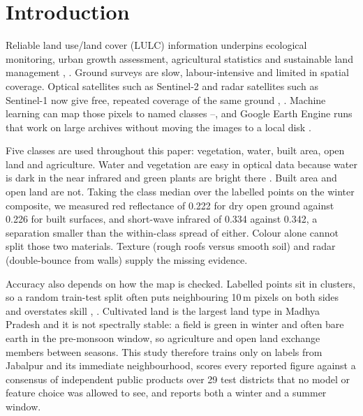 \documentclass[conference]{IEEEtran}
\begin{document}
\section{Introduction}
Reliable land use/land cover (LULC) information underpins ecological monitoring, urban growth assessment, agricultural statistics and sustainable land management \cite{r1}, \cite{r3}. Ground surveys are slow, labour-intensive and limited in spatial coverage. Optical satellites such as Sentinel-2 and radar satellites such as Sentinel-1 now give free, repeated coverage of the same ground \cite{r4}, \cite{r6}. Machine learning can map those pixels to named classes \cite{r7}--\cite{r9}, and Google Earth Engine runs that work on large archives without moving the images to a local disk \cite{r10}.

Five classes are used throughout this paper: vegetation, water, built area, open land and agriculture. Water and vegetation are easy in optical data because water is dark in the near infrared and green plants are bright there \cite{r2}. Built area and open land are not. Taking the class median over the labelled points on the winter composite, we measured red reflectance of 0.222 for dry open ground against 0.226 for built surfaces, and short-wave infrared of 0.334 against 0.342, a separation smaller than the within-class spread of either. Colour alone cannot split those two materials. Texture (rough roofs versus smooth soil) and radar (double-bounce from walls) supply the missing evidence.

Accuracy also depends on how the map is checked. Labelled points sit in clusters, so a random train-test split often puts neighbouring 10\,m pixels on both sides and overstates skill \cite{r18}, \cite{r19}. Cultivated land is the largest land type in Madhya Pradesh and it is not spectrally stable: a field is green in winter and often bare earth in the pre-monsoon window, so agriculture and open land exchange members between seasons. This study therefore trains only on labels from Jabalpur and its immediate neighbourhood, scores every reported figure against a consensus of independent public products over 29 test districts that no model or feature choice was allowed to see, and reports both a winter and a summer window.
\end{document}
